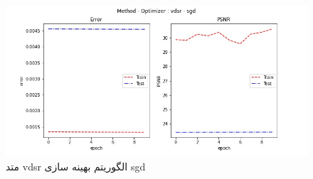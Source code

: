  \begin{figure}[!h] 
       \centering 
       \includegraphics[width=160mm]{./chapter3/images/error-psnr-vdsr-sgd.jpg}
       \caption{متد vdsr الگوریتم بهینه سازی sgd}
       \label{fig:error-psnr-vdsr-sgd}
 \end{figure}

